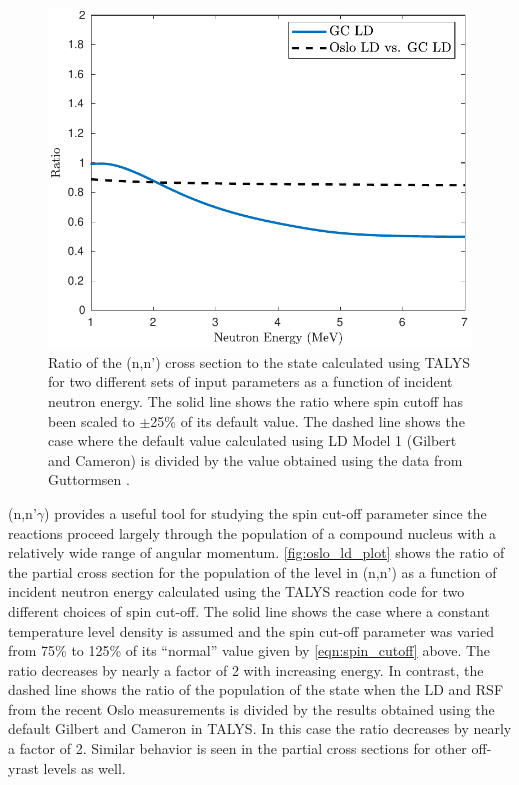 \documentclass[letterpaper]{ar-1col}
\begin{document}
\begin{figure}
 \centering
 \includegraphics[width=0.7\linewidth]{fig3.pdf}

 \caption{Ratio of the (n,n') cross section to the state calculated using TALYS for two different sets of input parameters as a function of incident neutron energy. The solid line shows the ratio where spin cutoff has been scaled to $\pm$25\% of its default value. The dashed line shows the case where the default value calculated using LD Model 1 (Gilbert and Cameron) is divided by the value obtained using the data from Guttormsen \cite{Gut13a}.}
 \label{fig:oslo_ld_plot}
\end{figure}



(n,n'$\gamma$) provides a useful tool for studying the spin cut-off parameter since the reactions proceed largely through the population of a compound nucleus with a relatively wide range of angular momentum. \autoref{fig:oslo_ld_plot} shows the ratio of the partial cross section for the population of the  level in (n,n') as a function of incident neutron energy calculated using the TALYS reaction code for two different choices of spin cut-off.  The solid line shows the case where a constant temperature level density is assumed and the spin cut-off parameter was varied from 75\% to 125\% of its \enquote{normal} value given by \autoref{eqn:spin_cutoff} above.  The ratio decreases by nearly a factor of 2 with increasing energy.  In contrast, the dashed line shows the ratio of the  population of the  state when the LD and RSF from the recent Oslo measurements \cite{Gut13a} is divided by the results obtained using the default Gilbert and Cameron in TALYS.  In this case the ratio decreases by nearly a factor of 2.  Similar behavior is seen in the partial cross sections for other off-yrast levels as well. 
\end{document}
